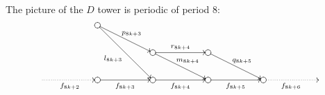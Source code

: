\documentclass[11pt]{amsart}
\numberwithin{equation}{subsection}
\theoremstyle{plain}
\theoremstyle{remark}
\theoremstyle{definition}
\begin{document}
%
 The picture of the $D$ tower  is periodic of  period $8$:
%
\begin{equation}\label{diriver}
 \centering
\xy
\POS(-20,0) = "z",
\POS(0,0) *\cir<3pt>{}="a",
\POS(20,0) *\cir<3pt>{}="b",
\POS(40,0) *\cir<3pt>{}="c",
\POS(60,0) *\cir<3pt>{}="d",
\POS(20,10) *\cir<3pt>{}="e",
\POS(40,10) *\cir<3pt>{}="x",
\POS(0,20) *\cir<3pt>{}="r",
\POS(80,0) ="y",
%
\POS "z" \ar@{.>}_{f_{8k+2}} "a",
\POS "a" \ar@{->}_{f_{8k+3}} "b",
\POS "b" \ar@{->}_{f_{8k+4}} "c",
\POS "c" \ar@{->}_{f_{8k+5}} "d",
\POS "e" \ar@{->}^{m_{8k+4}} "c",
\POS "r" \ar@{->}_{l_{8k+3}} "b",
\POS "r" \ar@{->}^{p_{8k+3}} "e",
\POS "d" \ar@{.>}_{f_{8k+6}} "y",
\POS "e" \ar@{->}^{r_{8k+4}} "x",
\POS "x" \ar@{->}^{q_{8k+5}} "d",
\endxy 
%
\end{equation}
%
%
\end{document}
